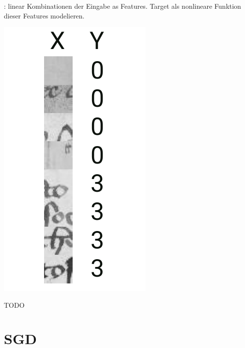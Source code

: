\cite[393]{Hastieelementsstatisticallearning2009}: linear Kombinationen der Eingabe as Features. Target als nonlineare Funktion dieser Features modelieren.  
\begin{marginfigure}
    \includegraphics[width=\textwidth]{figures/tasks/chen_examples.pdf}
    \caption{TODO}
    \label{fig:chen:cnn_task}
\end{marginfigure}
\section{SGD}
